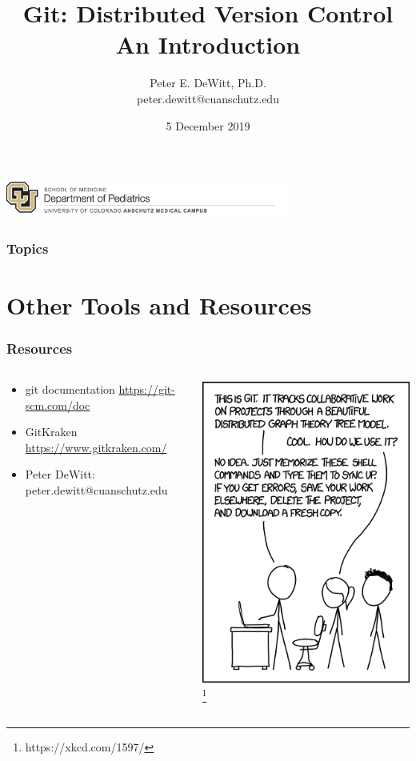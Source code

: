 \documentclass{beamer}
\author[Peter E. DeWitt]{Peter E. DeWitt, Ph.D.\inst{1} \\ peter.dewitt@cuanschutz.edu}
\institute[]{SOM | Department of Pediatrics | Informatics and Data Science}
\title[Intro to Git]{Git: Distributed Version Control \\ {\small An Introduction}}
\date{5 December 2019}
\begin{document}
  \begin{frame}[t,plain]
    \titlepage
    \includegraphics[width=0.7\textwidth]{som_pediatrics}
  \end{frame}

  \begin{frame}[t]
    \frametitle{Topics}
    \tableofcontents[hideallsubsections]
  \end{frame}

 
 
 
 

 \section{Other Tools and Resources}
  \begin{frame}
    \frametitle{Resources}
    \begin{columns}
    \begin{column}{0.5\textwidth}
    \begin{itemize}
      \item git documentation \url{https://git-scm.com/doc}
      \item GitKraken \url{https://www.gitkraken.com/}
      \item Peter DeWitt: peter.dewitt@cuanschutz.edu
    \end{itemize}
    \end{column}
    \begin{column}{0.5\textwidth}
      \includegraphics[height=0.8\textheight]{git}
      \footnote{https://xkcd.com/1597/}
    \end{column}
    \end{columns}
  \end{frame}
\end{document}
